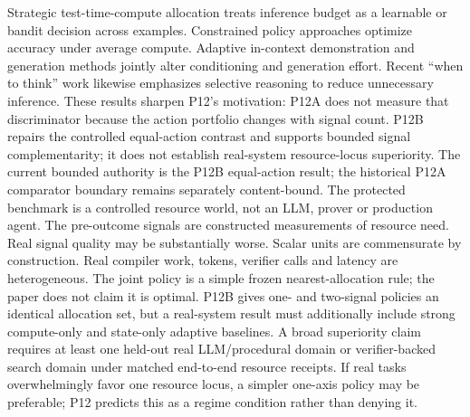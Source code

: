 \markdownRendererDocumentBegin
\markdownRendererSectionBegin
{}\markdownRendererInterblockSeparator
{}Strategic test-time-compute allocation treats inference budget as a learnable or bandit decision across examples. Constrained policy approaches optimize accuracy under average compute. Adaptive in-context demonstration and generation methods jointly alter conditioning and generation effort. Recent “when to think” work likewise emphasizes selective reasoning to reduce unnecessary inference.\markdownRendererInterblockSeparator
{}These results sharpen P12's motivation:  P12A does not measure that discriminator because the action portfolio changes with signal count. P12B repairs the controlled equal-action contrast and supports bounded signal complementarity; it does not establish real-system resource-locus superiority.\markdownRendererInterblockSeparator
{}The current bounded authority is the P12B equal-action result; the historical P12A comparator boundary remains separately content-bound.\markdownRendererInterblockSeparator
{}\markdownRendererSectionBegin
{}\markdownRendererInterblockSeparator
{}\markdownRendererOlBeginTight
{}The protected benchmark is a controlled resource world, not an LLM, prover or production agent.\markdownRendererOlItemEnd
{}The pre-outcome signals are constructed measurements of resource need. Real signal quality may be substantially worse.\markdownRendererOlItemEnd
{}Scalar units are commensurate by construction. Real compiler work, tokens, verifier calls and latency are heterogeneous.\markdownRendererOlItemEnd
{}The joint policy is a simple frozen nearest-allocation rule; the paper does not claim it is optimal.\markdownRendererOlItemEnd
{}P12B gives one- and two-signal policies an identical allocation set, but a real-system result must additionally include strong compute-only and state-only adaptive baselines.\markdownRendererOlItemEnd
{}A broad superiority claim requires at least one held-out real LLM/procedural domain or verifier-backed search domain under matched end-to-end resource receipts.\markdownRendererOlItemEnd
{}If real tasks overwhelmingly favor one resource locus, a simpler one-axis policy may be preferable; P12 predicts this as a regime condition rather than denying it.\markdownRendererOlItemEnd
